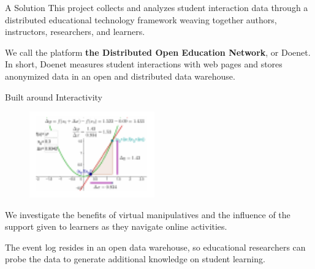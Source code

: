 \vspace{-2ex}
\vspace{1ex}

\begin{sectionblock}{A Solution}
  This project collects and analyzes student interaction data through
  a distributed educational technology framework weaving together
  authors, instructors, researchers, and learners.

  \vspace{1ex}We call the platform \textbf{the Distributed Open
    Education Network}, or Doenet.  In short, Doenet measures student
  interactions with web pages and stores anonymized data in an open
  and distributed data warehouse.
\end{sectionblock}

\vspace{1ex}

\begin{sectionblock}{Built around Interactivity}

  \begin{figure}
    \includegraphics[width=0.48\textwidth]{math-insight.pdf}
  \end{figure}
  We investigate the benefits of virtual manipulatives and the
  influence of the support given to learners as they navigate online
  activities.

  \vspace{1ex}The event log resides in an open data warehouse, so 
  educational researchers can probe the data to generate additional
  knowledge on student learning.
\end{sectionblock}

    
